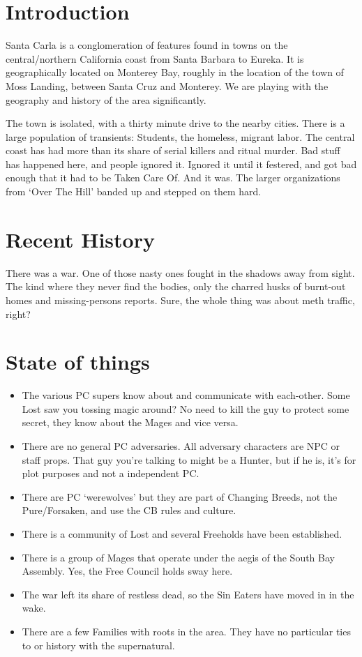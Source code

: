\section{Introduction}
Santa Carla is a conglomeration of features found in towns on the central/northern California coast from Santa Barbara to Eureka.
It is geographically located on Monterey Bay, roughly in the location of the town of Moss Landing, between Santa Cruz and Monterey.
We are playing with the geography and history of the area significantly.

The town is isolated, with a thirty minute drive to the nearby cities.
There is a large population of transients: Students, the homeless, migrant labor.
The central coast has had more than its share of serial killers and ritual murder.
Bad stuff has happened here, and people ignored it.
Ignored it until it festered, and got bad enough that it had to be Taken Care Of.
And it was.
The larger organizations from `Over The Hill' banded up and stepped on them hard.
\section{Recent History}
There was a war.
One of those nasty ones fought in the shadows away from sight.
The kind where they never find the bodies, only the charred husks of burnt-out homes and missing-persons reports.
Sure, the whole thing was about meth traffic, right?
\section{State of things}

\begin{itemize}
\item The various PC supers know about and communicate with each-other. Some Lost saw you tossing magic around? No need to kill the guy to protect some secret, they know about the Mages and vice versa.
\item There are no general PC adversaries. All adversary characters are NPC or staff props. That guy you're talking to might be a Hunter, but if he is, it's for plot purposes and not a independent PC.
\item There are PC `werewolves' but they are part of Changing Breeds, not the Pure/Forsaken, and use the CB rules and culture.
\item There is a community of Lost and several Freeholds have been established.
\item There is a group of Mages that operate under the aegis of the South Bay Assembly. Yes, the Free Council holds sway here.
\item The war left its share of restless dead, so the Sin Eaters have moved in in the wake.
\item There are a few Families with roots in the area. They have no particular ties to or history with the supernatural.
\end{itemize}
